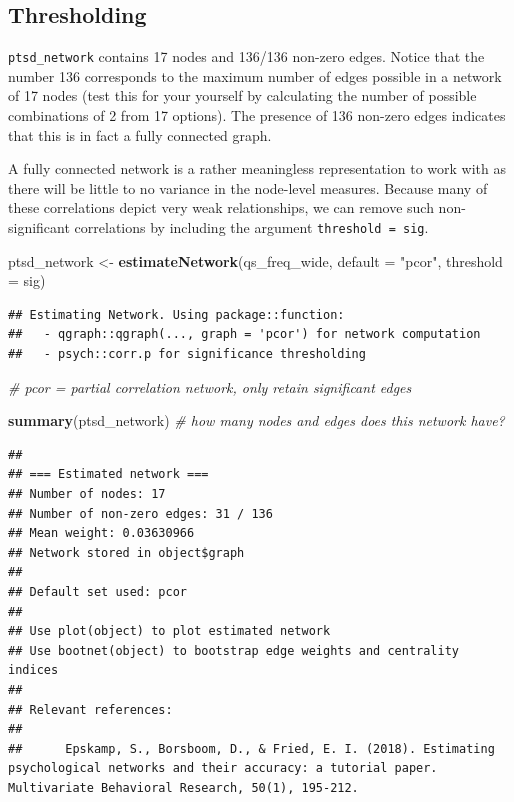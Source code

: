 \documentclass[
]{book}
\newenvironment{Shaded}{\begin{snugshade}}{\end{snugshade}}
\newcommand{\AttributeTok}[1]{\textcolor[rgb]{0.13,0.29,0.53}{#1}}
\newcommand{\CommentTok}[1]{\textcolor[rgb]{0.56,0.35,0.01}{\textit{#1}}}
\newcommand{\FunctionTok}[1]{\textcolor[rgb]{0.13,0.29,0.53}{\textbf{#1}}}
\newcommand{\NormalTok}[1]{#1}
\newcommand{\OtherTok}[1]{\textcolor[rgb]{0.56,0.35,0.01}{#1}}
\newcommand{\StringTok}[1]{\textcolor[rgb]{0.31,0.60,0.02}{#1}}
\begin{document}
\subsection{Thresholding}\label{thresholding}

\texttt{ptsd\_network} contains 17 nodes and 136/136 non-zero edges. Notice that the number 136 corresponds to the maximum number of edges possible in a network of 17 nodes (test this for your yourself by calculating the number of possible combinations of 2 from 17 options). The presence of 136 non-zero edges indicates that this is in fact a fully connected graph.

A fully connected network is a rather meaningless representation to work with as there will be little to no variance in the node-level measures. Because many of these correlations depict very weak relationships, we can remove such non-significant correlations by including the argument \texttt{threshold\ =\ \textquotesingle{}sig\textquotesingle{}}.

\begin{Shaded}
\begin{Highlighting}[]
\NormalTok{ptsd\_network }\OtherTok{\textless{}{-}} \FunctionTok{estimateNetwork}\NormalTok{(qs\_freq\_wide, }\AttributeTok{default =} \StringTok{"pcor"}\NormalTok{, }
                                \AttributeTok{threshold =} \StringTok{\textquotesingle{}sig\textquotesingle{}}\NormalTok{) }
\end{Highlighting}
\end{Shaded}

\begin{verbatim}
## Estimating Network. Using package::function:
##   - qgraph::qgraph(..., graph = 'pcor') for network computation
##   - psych::corr.p for significance thresholding
\end{verbatim}

\begin{Shaded}
\begin{Highlighting}[]
\CommentTok{\# pcor = partial correlation network, only retain significant edges }

\FunctionTok{summary}\NormalTok{(ptsd\_network) }\CommentTok{\# how many nodes and edges does this network have?}
\end{Highlighting}
\end{Shaded}

\begin{verbatim}
## 
## === Estimated network ===
## Number of nodes: 17 
## Number of non-zero edges: 31 / 136 
## Mean weight: 0.03630966 
## Network stored in object$graph 
##  
## Default set used: pcor 
##  
## Use plot(object) to plot estimated network 
## Use bootnet(object) to bootstrap edge weights and centrality indices 
## 
## Relevant references:
## 
##      Epskamp, S., Borsboom, D., & Fried, E. I. (2018). Estimating psychological networks and their accuracy: a tutorial paper. Multivariate Behavioral Research, 50(1), 195-212.
\end{verbatim}
\end{document}
